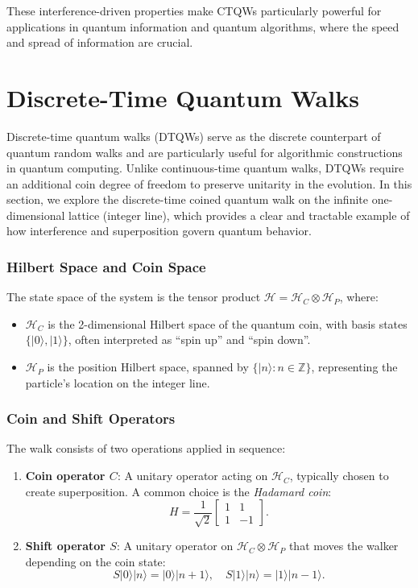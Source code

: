 \documentclass[11pt]{article}
\theoremstyle{definition}
\begin{document}
These interference-driven properties make CTQWs particularly powerful for applications in quantum information and quantum algorithms, where the speed and spread of information are crucial.




\section*{Discrete-Time Quantum Walks}



Discrete-time quantum walks (DTQWs) serve as the discrete counterpart of quantum random walks and are particularly useful for algorithmic constructions in quantum computing. Unlike continuous-time quantum walks, DTQWs require an additional coin degree of freedom to preserve unitarity in the evolution. In this section, we explore the discrete-time coined quantum walk on the infinite one-dimensional lattice (integer line), which provides a clear and tractable example of how interference and superposition govern quantum behavior.

\subsubsection*{Hilbert Space and Coin Space}

The state space of the system is the tensor product \( \mathcal{H} = \mathcal{H}_C \otimes \mathcal{H}_P \), where:
\begin{itemize}
    \item \( \mathcal{H}_C \) is the 2-dimensional Hilbert space of the quantum coin, with basis states \( \{|0\rangle, |1\rangle\} \), often interpreted as ``spin up'' and ``spin down''.
    \item \( \mathcal{H}_P \) is the position Hilbert space, spanned by \( \{|n\rangle : n \in \mathbb{Z}\} \), representing the particle's location on the integer line.
\end{itemize}

\subsubsection*{Coin and Shift Operators}

The walk consists of two operations applied in sequence:
\begin{enumerate}
    \item \textbf{Coin operator \( C \)}: A unitary operator acting on \( \mathcal{H}_C \), typically chosen to create superposition. A common choice is the \textit{Hadamard coin}:
    \[
    H = \frac{1}{\sqrt{2}} \begin{bmatrix}
    1 & 1 \\
    1 & -1
    \end{bmatrix}.
    \]
    \item \textbf{Shift operator \( S \)}: A unitary operator on \( \mathcal{H}_C \otimes \mathcal{H}_P \) that moves the walker depending on the coin state:
    \[
    S|0\rangle|n\rangle = |0\rangle|n + 1\rangle, \quad
    S|1\rangle|n\rangle = |1\rangle|n - 1\rangle.
    \]
\end{enumerate}
\end{document}
